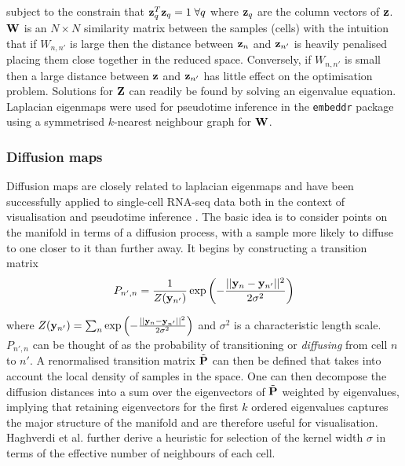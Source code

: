 subject to the constrain that $\mathbf{z}_q^T \mathbf{z}_q = 1 \; \forall q$ where $\mathbf{z}_q$ are the column vectors of $\mathbf{z}$.
 $\mathbf{W}$ is an $N \times N$ similarity matrix between the samples (cells) with the intuition that if
$W_{n,n'}$ is large then the distance between $\mathbf{z}_n$ and $\mathbf{z}_{n'}$ is heavily penalised placing them close together in the reduced space. Conversely, if $W_{n,n'}$ is small then a large distance between $\mathbf{z}$ and $\mathbf{z}_{n'}$ has little effect on the optimisation problem. Solutions for $\mathbf{Z}$ can readily be found by solving an eigenvalue equation. %
Laplacian eigenmaps were used for pseudotime inference in the \texttt{embeddr} package \cite{campbell2015laplacian} using a symmetrised $k$-nearest neighbour graph for $\mathbf{W}$.


\subsubsection{Diffusion maps} \label{sec:diffusion_maps}

Diffusion maps are closely related to laplacian eigenmaps and have been successfully applied to single-cell RNA-seq data both in the context of visualisation \cite{Haghverdi2015} and pseudotime inference \cite{haghverdi2016diffusion}. The basic idea is to consider points on the manifold in terms of a diffusion process, with a sample more likely to diffuse to one closer to it than further away. It begins by constructing a transition matrix
\begin{equation}
  P_{n',n} = \frac{1}{Z(\mathbf{y}_{n'})} \exp\left( - \frac{\lvert \lvert \mathbf{y}_n - \mathbf{y}_{n'} \rvert \rvert^2}{2 \sigma^2}\right)
\end{equation}

where $Z(\mathbf{y}_{n'}) = \sum_{n}  \exp\left( - \frac{\lvert \lvert \mathbf{y}_n - \mathbf{y}_{n'} \rvert \rvert^2}{2 \sigma^2}\right)$ and $\sigma^2$ is a characteristic length scale. $P_{n',n}$ can be thought of as the probability of transitioning or \emph{diffusing} from cell $n$ to $n'$. A renormalised transition matrix $\tilde{\mathbf{P}}$ can then be defined that takes into account the local density of samples in the space. One can then decompose the diffusion distances into a sum over the eigenvectors of $\tilde{\mathbf{P}}$
weighted by eigenvalues,
implying that retaining eigenvectors for the first $k$ ordered eigenvalues captures the major structure of the manifold and are therefore useful for visualisation. Haghverdi et al. \cite{Haghverdi2015} further derive a heuristic for selection of the kernel width $\sigma$ in terms of the effective number of neighbours of each cell.

